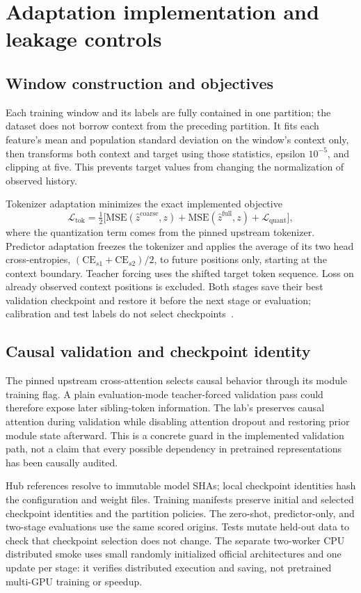 \documentclass[11pt,a4paper]{article}
\newcommand{\code}[1]{\texttt{\detokenize{#1}}}
\begin{document}
\section{Adaptation implementation and leakage controls}
\subsection{Window construction and objectives}
Each training window and its labels are fully contained in one partition; the
dataset does not borrow context from the preceding partition. It fits each
feature's mean and population standard deviation on the window's context only,
then transforms both context and target using those statistics, epsilon
$10^{-5}$, and clipping at five. This prevents target values from changing the
normalization of observed history.

Tokenizer adaptation minimizes the exact implemented objective
\[
 \mathcal L_{\mathrm{tok}}=\tfrac12\bigl[
  \mathrm{MSE}(\widehat z^{\mathrm{coarse}},z)+
  \mathrm{MSE}(\widehat z^{\mathrm{full}},z)+\mathcal L_{\mathrm{quant}}\bigr],
\]
where the quantization term comes from the pinned upstream tokenizer. Predictor
adaptation freezes the tokenizer and applies the average of its two head
cross-entropies, $(\mathrm{CE}_{s1}+\mathrm{CE}_{s2})/2$, to
future positions only, starting at the context boundary. Teacher forcing uses
the shifted target token sequence. Loss on already observed context positions
is excluded. Both stages save their best validation checkpoint and restore it
before the next stage or evaluation; calibration and test labels do not select
checkpoints~\cite{training}.

\subsection{Causal validation and checkpoint identity}
The pinned upstream cross-attention selects causal behavior through its module
training flag. A plain evaluation-mode teacher-forced validation pass could
therefore expose later sibling-token information. The lab's
\code{causal_loss_mode} preserves causal attention during validation while
disabling attention dropout and restoring prior module state afterward. This
is a concrete guard in the implemented validation path, not a claim that every
possible dependency in pretrained representations has been causally audited.

Hub references resolve to immutable model SHAs; local checkpoint identities
hash the configuration and weight files. Training manifests preserve initial
and selected checkpoint identities and the partition policies. The zero-shot,
predictor-only, and two-stage evaluations use the same scored origins. Tests
mutate held-out data to check that checkpoint selection does not change. The
separate two-worker CPU distributed smoke uses small randomly initialized
official architectures and one update per stage: it verifies distributed
execution and saving, not pretrained multi-GPU training or speedup.
\end{document}
